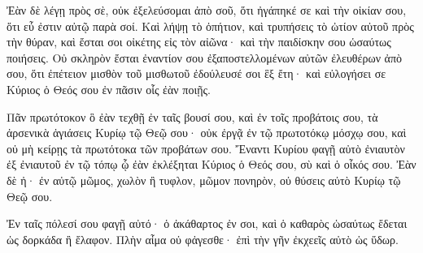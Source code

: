 {Ἐὰν δὲ λέγῃ πρὸς σὲ, οὐκ ἐξελεύσομαι ἀπὸ σοῦ, ὅτι ἠγάπηκέ σε καὶ τὴν οἰκίαν σου, ὅτι εὖ ἐστιν αὐτῷ παρὰ σοί.
Καὶ λήψῃ τὸ ὀπήτιον, καὶ τρυπήσεις τὸ ὠτίον αὐτοῦ πρὸς τὴν θύραν, καὶ ἔσται σοι οἰκέτης εἰς τὸν αἰῶνα· καὶ τὴν παιδίσκην σου ὡσαύτως ποιήσεις.
Οὐ σκληρὸν ἔσται ἐναντίον σου ἐξαποστελλομένων αὐτῶν ἐλευθέρων ἀπὸ σου, ὅτι ἐπέτειον μισθὸν τοῦ μισθωτοῦ ἐδούλευσέ σοι ἓξ ἔτη· καὶ εὐλογήσει σε Κύριος ὁ Θεός σου ἐν πᾶσιν οἷς ἐὰν ποιῇς.
\par }{\PP {}Πᾶν πρωτότοκον ὃ ἐὰν τεχθῇ ἐν ταῖς βουσί σου, καὶ ἐν τοῖς προβάτοις σου, τὰ ἀρσενικὰ ἁγιάσεις Κυρίῳ τῷ Θεῷ σου· οὐκ ἐργᾷ ἐν τῷ πρωτοτόκῳ μόσχῳ σου, καὶ οὐ μὴ κείρῃς τὰ πρωτότοκα τῶν προβάτων σου.
Ἔναντι Κυρίου φαγῇ αὐτὸ ἐνιαυτὸν ἐξ ἐνιαυτοῦ ἐν τῷ τόπῳ ᾧ ἐὰν ἐκλέξηται Κύριος ὁ Θεός σου, σὺ καὶ ὁ οἶκός σου.
Ἐὰν δὲ ἠ· ἐν αὐτῷ μῶμος, χωλὸν ἢ τυφλον, μῶμον πονηρὸν, οὐ θύσεις αὐτὸ Κυρίῳ τῷ Θεῷ σου.
\par }{\PP {}Ἐν ταῖς πόλεσί σου φαγῇ αὐτό· ὁ ἀκάθαρτος ἐν σοι, καὶ ὁ καθαρὸς ὡσαύτως ἔδεται ὡς δορκάδα ἢ ἔλαφον.
Πλὴν αἷμα οὐ φἀγεσθε· ἐπὶ τὴν γῆν ἐκχεεῖς αὐτὸ ὡς ὕδωρ.

}
